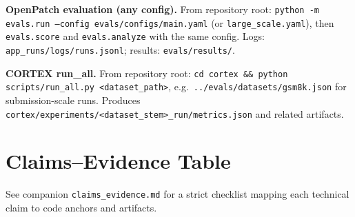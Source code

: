 \documentclass[11pt]{article}
\begin{document}
\textbf{OpenPatch evaluation (any config).} From repository root: \texttt{python -m evals.run --config evals/configs/main.yaml} (or \texttt{large\_scale.yaml}), then \texttt{evals.score} and \texttt{evals.analyze} with the same config. Logs: \texttt{app\_runs/logs/runs.jsonl}; results: \texttt{evals/results/}.

\textbf{CORTEX run\_all.} From repository root: \texttt{cd cortex \&\& python scripts/run\_all.py <dataset\_path>}, e.g.\ \texttt{../evals/datasets/gsm8k.json} for submission-scale runs. Produces \texttt{cortex/experiments/<dataset\_stem>\_run/metrics.json} and related artifacts.

\section*{Claims--Evidence Table}
\label{sec:claims}
See companion \texttt{claims\_evidence.md} for a strict checklist mapping each technical claim to code anchors and artifacts.



\end{document}
